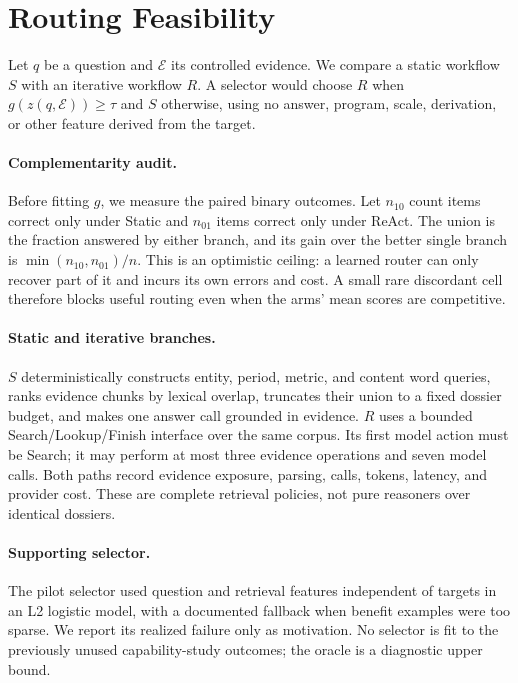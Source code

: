 \section{Routing Feasibility}
\label{sec:method}

Let $q$ be a question and $\mathcal{E}$ its controlled evidence. We compare a
static workflow $S$ with an iterative workflow $R$. A selector would choose
$R$ when $g(z(q,\mathcal{E}))\geq\tau$ and $S$ otherwise, using no answer,
program, scale, derivation, or other feature derived from the target.

\paragraph{Complementarity audit.}
Before fitting $g$, we measure the paired binary outcomes. Let $n_{10}$ count
items correct only under Static and $n_{01}$ items correct only under ReAct. The
union is the fraction answered by either branch, and its gain over the better
single branch is $\min(n_{10},n_{01})/n$. This is an optimistic ceiling: a
learned router can only recover part of it and incurs its own errors and cost.
A small rare discordant cell therefore blocks useful routing even when the
arms' mean scores are competitive.

\paragraph{Static and iterative branches.}
$S$ deterministically constructs entity, period, metric, and content word
queries, ranks evidence chunks by lexical overlap, truncates their union to a
fixed dossier budget, and makes one answer call grounded in evidence. $R$ uses a
bounded Search/Lookup/Finish interface over the same corpus. Its first model
action must be Search; it may perform at most three evidence operations and
seven model calls. Both paths record evidence exposure, parsing, calls, tokens,
latency, and provider cost. These are complete retrieval policies, not pure
reasoners over identical dossiers.

\paragraph{Supporting selector.}
The pilot selector used question and retrieval features independent of targets
in an L2 logistic model, with a documented fallback when benefit examples were too
sparse. We report its realized failure only as motivation. No selector is fit
to the previously unused capability-study outcomes; the oracle is a diagnostic upper
bound.
